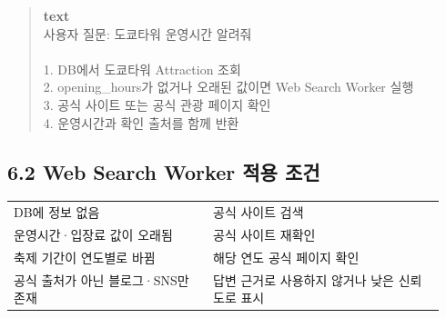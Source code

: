 \documentclass[12pt,a4paper]{article}
\newcommand{\DocNeedspace}[1]{\par\ifdim\dimexpr\pagegoal-\pagetotal\relax<#1\newpage\fi}
\begin{document}
\DocNeedspace{7\baselineskip}
\begin{quote}
\begin{scriptsize}
\ttfamily
\RaggedRight
\setlength{\parskip}{1pt}
\textcolor{LovvGreen}{\textbf{text}}\\[0.2em]
{\normalfont 사용자} {\normalfont 질문}:\allowbreak{} {\normalfont 도쿄타워} {\normalfont 운영시간} {\normalfont 알려줘}\\
\mbox{}\\
1.\allowbreak{} DB{\normalfont 에서} {\normalfont 도쿄타워} Attraction {\normalfont 조회}\\
2.\allowbreak{} opening\_\allowbreak{}hours{\normalfont 가} {\normalfont 없거나} {\normalfont 오래된} {\normalfont 값이면} Web Search Worker {\normalfont 실행}\\
3.\allowbreak{} {\normalfont 공식} {\normalfont 사이트} {\normalfont 또는} {\normalfont 공식} {\normalfont 관광} {\normalfont 페이지} {\normalfont 확인}\\
4.\allowbreak{} {\normalfont 운영시간과} {\normalfont 확인} {\normalfont 출처를} {\normalfont 함께} {\normalfont 반환}\\
\end{scriptsize}
\end{quote}


\DocNeedspace{24\baselineskip}
\subsection*{6.2 Web Search Worker 적용 조건}


\DocNeedspace{14\baselineskip}
\begin{small}
\begin{longtable}{@{}>{\RaggedRight\arraybackslash}m{0.432\linewidth}>{\RaggedRight\arraybackslash}m{0.508\linewidth}@{}}
\toprule
\multicolumn{1}{>{\centering\arraybackslash}m{0.432\linewidth}}{\textbf{조건}} & \multicolumn{1}{>{\centering\arraybackslash}m{0.508\linewidth}}{\textbf{처리}} \\
\midrule
\endhead
DB에 정보 없음 & 공식 사이트 검색 \\
운영시간·입장료 값이 오래됨 & 공식 사이트 재확인 \\
축제 기간이 연도별로 바뀜 & 해당 연도 공식 페이지 확인 \\
공식 출처가 아닌 블로그·SNS만 존재 & 답변 근거로 사용하지 않거나 낮은 신뢰도로 표시 \\
\bottomrule
\end{longtable}
\end{small}
\end{document}
